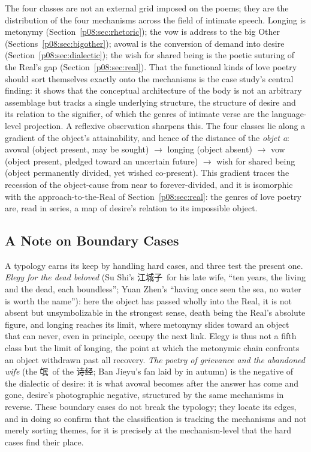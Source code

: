 The four classes are not an external grid imposed on the poems; they are the distribution of the four mechanisms across the field of intimate speech. Longing is metonymy (Section~\ref{p08:sec:rhetoric}); the vow is address to the big Other (Sections~\ref{p08:sec:bigother}); avowal is the conversion of demand into desire (Section~\ref{p08:sec:dialectic}); the wish for shared being is the poetic suturing of the Real's gap (Section~\ref{p08:sec:real}). That the functional kinds of love poetry should sort themselves exactly onto the mechanisms is the case study's central finding: it shows that the conceptual architecture of the body is not an arbitrary assemblage but tracks a single underlying structure, the structure of desire and its relation to the signifier, of which the genres of intimate verse are the language-level projection. A reflexive observation sharpens this. The four classes lie along a gradient of the object's attainability, and hence of the distance of the \textit{objet a}: avowal (object present, may be sought) $\rightarrow$ longing (object absent) $\rightarrow$ vow (object present, pledged toward an uncertain future) $\rightarrow$ wish for shared being (object permanently divided, yet wished co-present). This gradient traces the recession of the object-cause from near to forever-divided, and it is isomorphic with the approach-to-the-Real of Section~\ref{p08:sec:real}: the genres of love poetry are, read in series, a map of desire's relation to its impossible object.

\subsection{A Note on Boundary Cases}\label{p08:sec:case-boundary}

A typology earns its keep by handling hard cases, and three test the present one. \emph{Elegy for the dead beloved} (Su Shi's \cjkfont 江城子\normalfont\ for his late wife, ``ten years, the living and the dead, each boundless''; Yuan Zhen's ``having once seen the sea, no water is worth the name''): here the object has passed wholly into the Real, it is not absent but unsymbolizable in the strongest sense, death being the Real's absolute figure, and longing reaches its limit, where metonymy slides toward an object that can never, even in principle, occupy the next link. Elegy is thus not a fifth class but the limit of longing, the point at which the metonymic chain confronts an object withdrawn past all recovery. \emph{The poetry of grievance and the abandoned wife} (the \cjkfont 氓\normalfont\ of the \cjkfont 诗经\normalfont; Ban Jieyu's fan laid by in autumn) is the negative of the dialectic of desire: it is what avowal becomes after the answer has come and gone, desire's photographic negative, structured by the same mechanisms in reverse. These boundary cases do not break the typology; they locate its edges, and in doing so confirm that the classification is tracking the mechanisms and not merely sorting themes, for it is precisely at the mechanism-level that the hard cases find their place.

